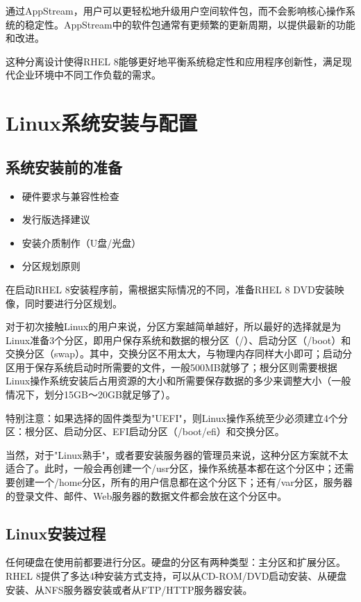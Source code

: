 \documentclass[12pt,UTF8]{ctexbook}
\begin{document}
通过AppStream，用户可以更轻松地升级用户空间软件包，而不会影响核心操作系统的稳定性。AppStream中的软件包通常有更频繁的更新周期，以提供最新的功能和改进。

这种分离设计使得RHEL 8能够更好地平衡系统稳定性和应用程序创新性，满足现代企业环境中不同工作负载的需求。

\chapter{Linux系统安装与配置}

\section{系统安装前的准备}
\begin{itemize}
    \item 硬件要求与兼容性检查
    \item 发行版选择建议
    \item 安装介质制作（U盘/光盘）
    \item 分区规划原则
\end{itemize}

在启动RHEL 8安装程序前，需根据实际情况的不同，准备RHEL 8 DVD安装映像，同时要进行分区规划。

对于初次接触Linux的用户来说，分区方案越简单越好，所以最好的选择就是为Linux准备3个分区，即用户保存系统和数据的根分区（/）、启动分区（/boot）和交换分区（swap）。其中，交换分区不用太大，与物理内存同样大小即可；启动分区用于保存系统启动时所需要的文件，一般500MB就够了；根分区则需要根据Linux操作系统安装后占用资源的大小和所需要保存数据的多少来调整大小（一般情况下，划分15GB～20GB就足够了）。

特别注意：如果选择的固件类型为"UEFI"，则Linux操作系统至少必须建立4个分区：根分区、启动分区、EFI启动分区（/boot/efi）和交换分区。

当然，对于"Linux熟手"，或者要安装服务器的管理员来说，这种分区方案就不太适合了。此时，一般会再创建一个/usr分区，操作系统基本都在这个分区中；还需要创建一个/home分区，所有的用户信息都在这个分区下；还有/var分区，服务器的登录文件、邮件、Web服务器的数据文件都会放在这个分区中。

\section{Linux安装过程}
任何硬盘在使用前都要进行分区。硬盘的分区有两种类型：主分区和扩展分区。RHEL 8提供了多达4种安装方式支持，可以从CD-ROM/DVD启动安装、从硬盘安装、从NFS服务器安装或者从FTP/HTTP服务器安装。
\end{document}
